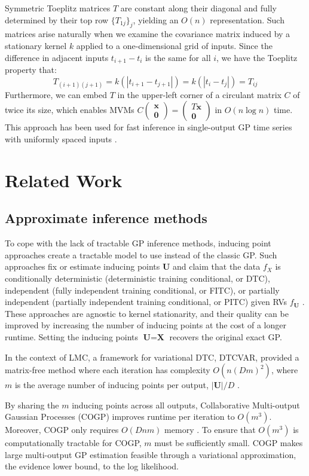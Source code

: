 \documentclass{article}
\def\Tx{\textbf{x}}
\def\TX{\textbf{X}}
\def\TU{\textbf{U}}
\newcommand{\card}[1]{\left\vert{#1}\right\vert}
\newcommand{\mat}[1]{\begin{pmatrix} #1 \end{pmatrix}}
\newcommand{\abs}[1]{\left|#1\right|}
\begin{document}
Symmetric Toeplitz matrices $T$ are constant along their diagonal and fully determined by their top row $\{T_{1j}\}_j$, yielding an $O(n)$ representation. Such matrices arise naturally when we examine the covariance matrix induced by a stationary kernel $k$ applied to a one-dimensional grid of inputs. Since the difference in adjacent inputs $t_{i+1}-t_{i}$ is the same for all $i$, we have the Toeplitz property that:
\[
T_{(i+1)(j+1)}=k(\abs{t_{i+1} -t_{j+1}})=k(\abs{t_i-t_j})=T_{ij}
\]
Furthermore, we can embed $T$ in the upper-left corner of a circulant matrix $C$ of twice its size, which enables MVMs  $C\mat{\Tx\\\textbf{0}}=\mat{T\Tx\\\textbf{0}}$ in $O(n\log n)$ time. This approach has been used for fast inference in single-output GP time series with uniformly spaced inputs \cite{cunningham2008fast}.

\section{Related Work}
\label{sec:related-work}
\subsection{Approximate inference methods}

To cope with the lack of tractable GP inference methods, inducing point approaches create a tractable model to use instead of the classic GP. Such approaches fix or estimate inducing points $\TU$ and claim that the data $f_X$ is conditionally deterministic (deterministic training conditional, or DTC), independent (fully independent training conditional, or FITC), or partially independent (partially independent training conditional, or PITC) given RVs $f_{\TU}$  \cite{quinonero2005unifying}. These approaches are agnostic to kernel stationarity, and their quality can be improved by increasing the number of inducing points at the cost of a longer runtime. Setting the inducing points $\TU=\TX$ recovers the original exact GP.

In the context of LMC, a framework for variational DTC, DTCVAR, provided a matrix-free method where each iteration has complexity $O(n(Dm)^2)$, where $m$ is the average number of inducing points per output, $\card{\TU}/D$ \cite{alvarez2010efficient}. 

By sharing the $m$ inducing points across all outputs, Collaborative Multi-output Gaussian Processes (COGP) improves runtime per iteration to $O(m^3)$. Moreover, COGP only requires $O(Dnm)$ memory \cite{nguyen2014collaborative}. To ensure that $O(m^3)$ is computationally tractable for COGP, $m$ must be sufficiently small. COGP makes large multi-output GP estimation feasible through a variational approximation, the evidence lower bound, to the log likelihood.
\end{document}
